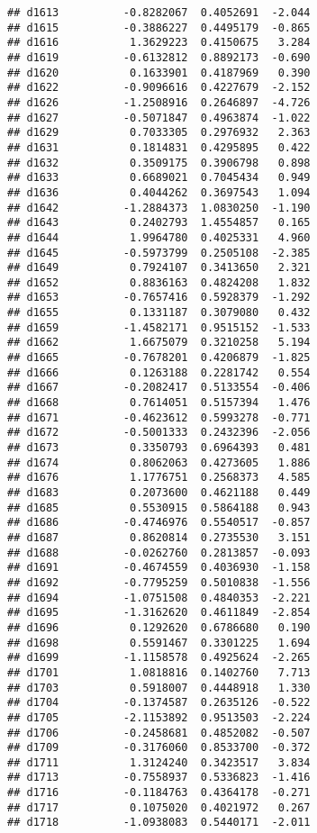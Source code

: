 \documentclass[
]{article}
\begin{document}
\begin{verbatim}
## d1613          -0.8282067  0.4052691  -2.044
## d1615          -0.3886227  0.4495179  -0.865
## d1616           1.3629223  0.4150675   3.284
## d1619          -0.6132812  0.8892173  -0.690
## d1620           0.1633901  0.4187969   0.390
## d1622          -0.9096616  0.4227679  -2.152
## d1626          -1.2508916  0.2646897  -4.726
## d1627          -0.5071847  0.4963874  -1.022
## d1629           0.7033305  0.2976932   2.363
## d1631           0.1814831  0.4295895   0.422
## d1632           0.3509175  0.3906798   0.898
## d1633           0.6689021  0.7045434   0.949
## d1636           0.4044262  0.3697543   1.094
## d1642          -1.2884373  1.0830250  -1.190
## d1643           0.2402793  1.4554857   0.165
## d1644           1.9964780  0.4025331   4.960
## d1645          -0.5973799  0.2505108  -2.385
## d1649           0.7924107  0.3413650   2.321
## d1652           0.8836163  0.4824208   1.832
## d1653          -0.7657416  0.5928379  -1.292
## d1655           0.1331187  0.3079080   0.432
## d1659          -1.4582171  0.9515152  -1.533
## d1662           1.6675079  0.3210258   5.194
## d1665          -0.7678201  0.4206879  -1.825
## d1666           0.1263188  0.2281742   0.554
## d1667          -0.2082417  0.5133554  -0.406
## d1668           0.7614051  0.5157394   1.476
## d1671          -0.4623612  0.5993278  -0.771
## d1672          -0.5001333  0.2432396  -2.056
## d1673           0.3350793  0.6964393   0.481
## d1674           0.8062063  0.4273605   1.886
## d1676           1.1776751  0.2568373   4.585
## d1683           0.2073600  0.4621188   0.449
## d1685           0.5530915  0.5864188   0.943
## d1686          -0.4746976  0.5540517  -0.857
## d1687           0.8620814  0.2735530   3.151
## d1688          -0.0262760  0.2813857  -0.093
## d1691          -0.4674559  0.4036930  -1.158
## d1692          -0.7795259  0.5010838  -1.556
## d1694          -1.0751508  0.4840353  -2.221
## d1695          -1.3162620  0.4611849  -2.854
## d1696           0.1292620  0.6786680   0.190
## d1698           0.5591467  0.3301225   1.694
## d1699          -1.1158578  0.4925624  -2.265
## d1701           1.0818816  0.1402760   7.713
## d1703           0.5918007  0.4448918   1.330
## d1704          -0.1374587  0.2635126  -0.522
## d1705          -2.1153892  0.9513503  -2.224
## d1706          -0.2458681  0.4852082  -0.507
## d1709          -0.3176060  0.8533700  -0.372
## d1711           1.3124240  0.3423517   3.834
## d1713          -0.7558937  0.5336823  -1.416
## d1716          -0.1184763  0.4364178  -0.271
## d1717           0.1075020  0.4021972   0.267
## d1718          -1.0938083  0.5440171  -2.011

\end{verbatim}
\end{document}
